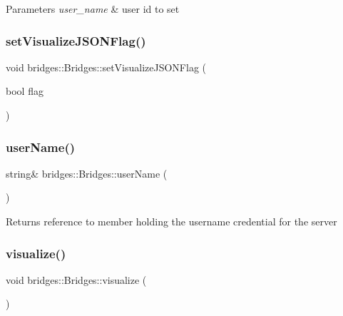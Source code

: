 \begin{DoxyParams}{Parameters}
{\em user\+\_\+name} & user id to set \\
\hline
\end{DoxyParams}
\mbox{\label{namespacebridges_1_1_bridges_a69aca37ab2729d0345e0549d7baf0423}} 
\subsubsection{\texorpdfstring{set\+Visualize\+J\+S\+O\+N\+Flag()}{setVisualizeJSONFlag()}}
{\footnotesize\ttfamily void bridges\+::\+Bridges\+::set\+Visualize\+J\+S\+O\+N\+Flag (\begin{DoxyParamCaption}\item[{bool}]{flag }\end{DoxyParamCaption})}

\mbox{\label{namespacebridges_1_1_bridges_a98c0c6658b8eb9e8f20a7f3119cbd984}} 
\subsubsection{\texorpdfstring{user\+Name()}{userName()}}
{\footnotesize\ttfamily string\& bridges\+::\+Bridges\+::user\+Name (\begin{DoxyParamCaption}{ }\end{DoxyParamCaption})}

\begin{DoxyReturn}{Returns}
reference to member holding the username credential for the server 
\end{DoxyReturn}
\mbox{\label{namespacebridges_1_1_bridges_a2806e395134614cdd6327400b53d28ad}} 
\subsubsection{\texorpdfstring{visualize()}{visualize()}}
{\footnotesize\ttfamily void bridges\+::\+Bridges\+::visualize (\begin{DoxyParamCaption}{ }\end{DoxyParamCaption})}


